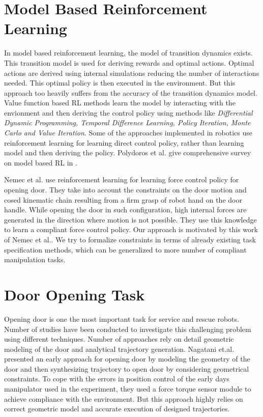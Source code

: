 \documentclass[thesis]{mas_proposal}
\begin{document}
\section{Model Based Reinforcement Learning} \label{mod-RL}
In model based  reinforcement learning, the model of transition dynamics exists. This transition model is used for deriving rewards and optimal actions. Optimal actions are derived using internal simulations reducing the number of interactions needed. This optimal policy is then executed in the environment. But this approach too heavily suffers from the accuracy of the transition dynamics model. Value function based RL methods learn the model by interacting with the envionment and then deriving the control policy using methods like \textit{Differential Dynamic Programming, Temporal Difference Learning, Policy Iteration, Monte Carlo and Value Iteration}\cite{polydoros2017survey}. Some of the approaches implemented in robotics use reinforcement learning for learning direct control policy, rather than learning model and then deriving the policy\cite{polydoros2017survey}. Polydoros et al. give comprehensive survey on model based RL in \cite{polydoros2017survey}. 

Nemec et al. use reinforcement learning for learning force control policy for opening door\cite{nemec2017door}. They take into account the constraints on the door motion and cosed kinematic chain resulting from a firm grasp of robot hand on the door handle. While opening the door in such configuration, high internal forces are generated in the direction where motion is not possible. They use this knowledge to learn a compliant force control policy. Our approach is motivated by this work of Nemec et al.\cite{nemec2017door}. We try to formalize constraints in terms of already existing task specification methods, which can be generalized to more number of compliant manipulation tasks. 

\section{Door Opening Task}

Opening door is one the most important task for service and rescue robots. Number of studies have been conducted to investigate this challenging problem using different techniques. Number of approaches rely on detail geometric modeling of the door and analytical trajectory generation. Nagatani et.al. \cite{nagatani1995experiment} presented an early approach for opening door by modeling the geometry of the door and then synthesizing trajectory to open door by considering geometrical constraints. To cope with the errors in position control of the early days manipulator used in the experiment, they used a force torque sensor module to achieve compliance with the environment. But this approach highly relies on correct geometric model and accurate execution of designed trajectories.
\end{document}
